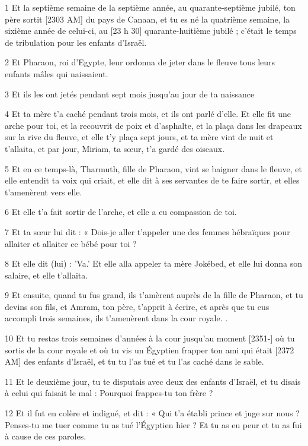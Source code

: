 \par 1 Et la septième semaine de la septième année, au quarante-septième jubilé, ton père sortit [2303 AM] du pays de Canaan, et tu es né la quatrième semaine, la sixième année de celui-ci, au [23 h 30] quarante-huitième jubilé ; c'était le temps de tribulation pour les enfants d'Israël.
\par 2 Et Pharaon, roi d'Egypte, leur ordonna de jeter dans le fleuve tous leurs enfants mâles qui naissaient.
\par 3 Et ils les ont jetés pendant sept mois jusqu'au jour de ta naissance
\par 4 Et ta mère t'a caché pendant trois mois, et ils ont parlé d'elle. Et elle fit une arche pour toi, et la recouvrit de poix et d'asphalte, et la plaça dans les drapeaux sur la rive du fleuve, et elle t'y plaça sept jours, et ta mère vint de nuit et t'allaita, et par jour, Miriam, ta sœur, t'a gardé des oiseaux.
\par 5 Et en ce temps-là, Tharmuth, fille de Pharaon, vint se baigner dans le fleuve, et elle entendit ta voix qui criait, et elle dit à ses servantes de te faire sortir, et elles t'amenèrent vers elle.
\par 6 Et elle t'a fait sortir de l'arche, et elle a eu compassion de toi.
\par 7 Et ta sœur lui dit : « Dois-je aller t'appeler une des femmes hébraïques pour allaiter et allaiter ce bébé pour toi ?
\par 8 Et elle dit (lui) : 'Va.' Et elle alla appeler ta mère Jokébed, et elle lui donna son salaire, et elle t'allaita.
\par 9 Et ensuite, quand tu fus grand, ils t'amèrent auprès de la fille de Pharaon, et tu devins son fils, et Amram, ton père, t'apprit à écrire, et après que tu eus accompli trois semaines, ils t'amenèrent dans la cour royale. .
\par 10 Et tu restas trois semaines d'années à la cour jusqu'au moment [2351-] où tu sortis de la cour royale et où tu vis un Égyptien frapper ton ami qui était [2372 AM] des enfants d'Israël, et tu tu l'as tué et tu l'as caché dans le sable.
\par 11 Et le deuxième jour, tu te disputais avec deux des enfants d'Israël, et tu disais à celui qui faisait le mal : Pourquoi frappes-tu ton frère ?
\par 12 Et il fut en colère et indigné, et dit : « Qui t'a établi prince et juge sur nous ? Penses-tu me tuer comme tu as tué l'Égyptien hier ? Et tu as eu peur et tu as fui à cause de ces paroles.


